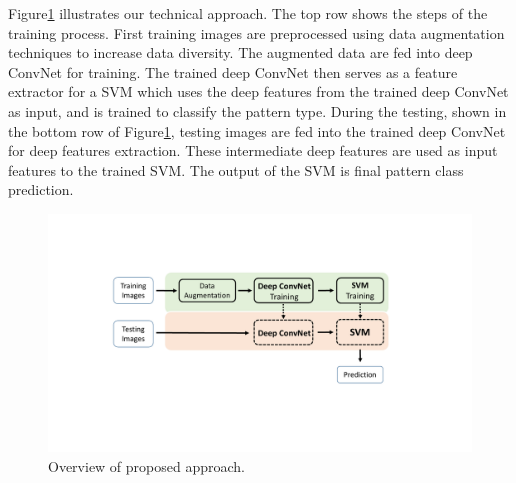 
Figure\ref{fig.method} illustrates our technical approach.   
%
The top row shows the steps of the training process.  First training images are preprocessed using data augmentation techniques to increase data diversity. 
The augmented data are fed into deep ConvNet for training. The trained deep ConvNet then serves as a feature extractor for a SVM which uses the deep features from the trained deep ConvNet as input, and is trained to classify the pattern type.
%
During the testing, shown in the bottom row of Figure\ref{fig.method}, testing images are fed into the trained deep ConvNet for deep features extraction. These intermediate deep features are used as input features to the trained SVM. The output of the SVM is final pattern class prediction.


\begin{figure}[!ht]
	\begin{center}
		\includegraphics[scale=0.38,clip=true,trim = 50mm 55mm 50mm 50mm]{fig/figs/method_overview.pdf}
	\end{center}
	\caption{Overview of proposed approach.} 
	\label{fig.method}
\end{figure}

